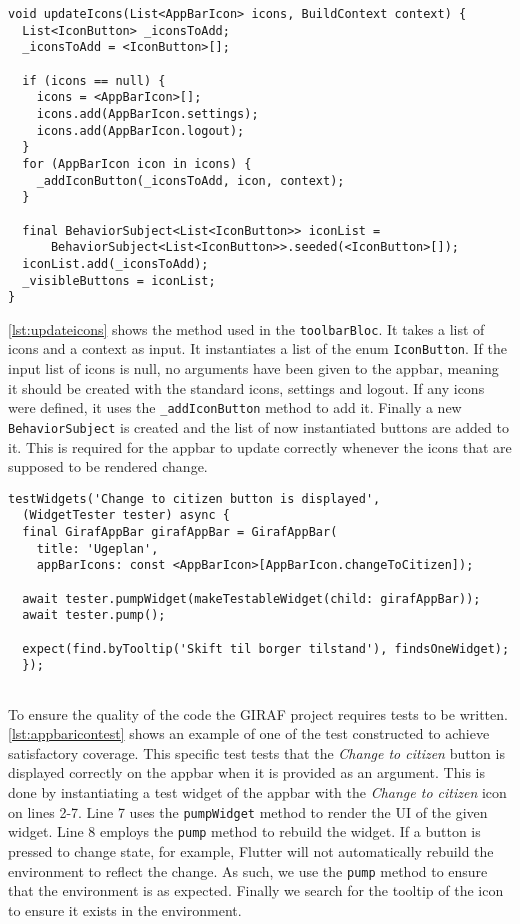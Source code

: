 \begin{lstlisting}[caption={Updating the icons in the appbar},label={lst:updateicons},language={[Sharp]C}]
  void updateIcons(List<AppBarIcon> icons, BuildContext context) {
  List<IconButton> _iconsToAdd;
  _iconsToAdd = <IconButton>[];

  if (icons == null) {
    icons = <AppBarIcon>[];
    icons.add(AppBarIcon.settings);
    icons.add(AppBarIcon.logout);
  }
  for (AppBarIcon icon in icons) {
    _addIconButton(_iconsToAdd, icon, context);
  }

  final BehaviorSubject<List<IconButton>> iconList =
      BehaviorSubject<List<IconButton>>.seeded(<IconButton>[]);
  iconList.add(_iconsToAdd);
  _visibleButtons = iconList;
}
\end{lstlisting}
\autoref{lst:updateicons} shows the method used in the \texttt{toolbarBloc}.
It takes a list of icons and a context as input.
It instantiates a list of the enum \texttt{IconButton}.
If the input list of icons is null, no arguments have been given to the appbar, meaning it should be created with the standard icons, settings and logout.
If any icons were defined, it uses the \texttt{\_addIconButton} method to add it.
Finally a new \texttt{BehaviorSubject} is created and the list of now instantiated buttons are added to it.
This is required for the appbar to update correctly whenever the icons that are supposed to be rendered change.

\begin{lstlisting}[caption={Testing the appbar with certain icons},label={lst:appbaricontest},language={[Sharp]C}]
  testWidgets('Change to citizen button is displayed',
  (WidgetTester tester) async {
  final GirafAppBar girafAppBar = GirafAppBar(
    title: 'Ugeplan',
    appBarIcons: const <AppBarIcon>[AppBarIcon.changeToCitizen]);
  
  await tester.pumpWidget(makeTestableWidget(child: girafAppBar));
  await tester.pump();
  
  expect(find.byTooltip('Skift til borger tilstand'), findsOneWidget);
  });
  
\end{lstlisting}
To ensure the quality of the code the GIRAF project requires tests to be written.
\autoref{lst:appbaricontest} shows an example of one of the test constructed to achieve satisfactory coverage.
This specific test tests that the \textit{Change to citizen} button is displayed correctly on the appbar when it is provided as an argument.
This is done by instantiating a test widget of the appbar with the \textit{Change to citizen} icon on lines 2-7.
Line 7 uses the \texttt{pumpWidget} method to render the UI of the given widget.
Line 8 employs the \texttt{pump} method to rebuild the widget.
If a button is pressed to change state, for example, Flutter will not automatically rebuild the environment to reflect the change.
As such, we use the \texttt{pump} method to ensure that the environment is as expected.
Finally we search for the tooltip of the icon to ensure it exists in the environment.

